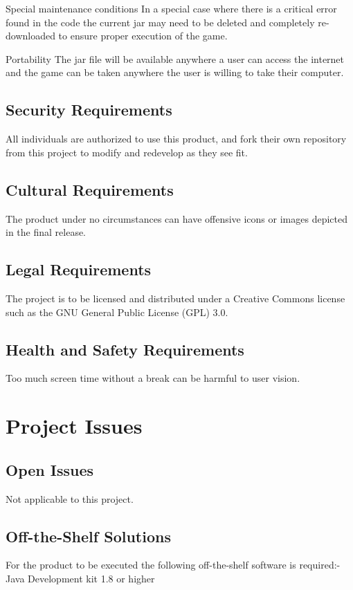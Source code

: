 \documentclass[12pt, titlepage]{article}
\begin{document}
Special maintenance conditions
In a special case where there is a critical error found in the code the current
jar may need to be deleted and completely re-downloaded to ensure proper
execution of the game.
 
Portability
The jar file will be available anywhere a user can access the internet and the
game can be taken anywhere the user is willing to take their computer.

\subsection{Security Requirements}
All individuals are authorized to use this product, and fork their own
repository from this project to modify and redevelop as they see fit.

\subsection{Cultural Requirements}
The product under no circumstances can have offensive icons or images depicted
in the final release.

\subsection{Legal Requirements}
The project is to be licensed and distributed under a Creative Commons license
such as the GNU General Public License (GPL) 3.0.

\subsection{Health and Safety Requirements}
Too much screen time without a break can be harmful to user vision. 

\section{Project Issues}
\subsection{Open Issues}
Not applicable to this project.

\subsection{Off-the-Shelf Solutions}
For the product to be executed the following off-the-shelf software is
required:-Java Development kit 1.8 or higher
\end{document}
